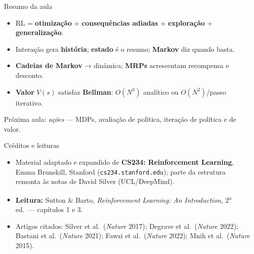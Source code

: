 \documentclass[aspectratio=169, 11pt]{beamer}
\begin{document}
\begin{frame}{Resumo da aula}
  \begin{itemize}
    \item RL = \textbf{otimização} + \textbf{consequências adiadas} + \textbf{exploração} + \textbf{generalização}.
    \item Interação gera \textbf{história}; \textbf{estado} é o resumo; \textbf{Markov} diz quando basta.
    \item \textbf{Cadeias de Markov} → dinâmica; \textbf{MRPs} acrescentam recompensa e desconto.
    \item \textbf{Valor} $V(s)$ satisfaz \textbf{Bellman}: $O(N^3)$ analítico ou $O(N^2)$/passo iterativo.
  \end{itemize}

  \begin{ideiabox}
    Próxima aula: \emph{ações} — MDPs, avaliação de política, iteração de política e de valor.
  \end{ideiabox}
\end{frame}

\begin{frame}{Créditos e leituras}
  \begin{itemize}
    \item Material adaptado e expandido de \textbf{CS234: Reinforcement Learning}, Emma Brunskill, Stanford (\texttt{cs234.stanford.edu}); parte da estrutura remonta às notas de David Silver (UCL/DeepMind).
    \item \textbf{Leitura:} Sutton \& Barto, \emph{Reinforcement Learning: An Introduction}, 2\textsuperscript{a} ed.\ — capítulos 1 e 3.
    \item Artigos citados: Silver et al.\ (\emph{Nature} 2017); Degrave et al.\ (\emph{Nature} 2022); Bastani et al.\ (\emph{Nature} 2021); Fawzi et al.\ (\emph{Nature} 2022); Mnih et al.\ (\emph{Nature} 2015).
  \end{itemize}
\end{frame}
\end{document}
